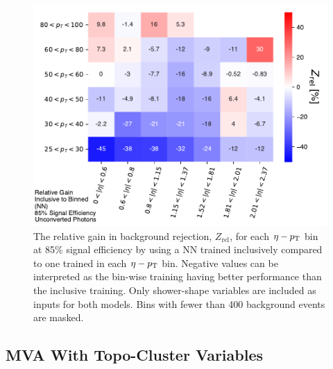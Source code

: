 \begin{figure}[!htb]
    \centering
    \includegraphics[width=.85\textwidth]{chapters/chapter4_photonID/images/NNinclusive_v_NN_normed.pdf}
    \caption[The relative gain in background rejection by using a \gls{NN} trained inclusively compared to one trained bin-wise]
    {The relative gain in background rejection, $Z_{\text{rel}}$, for each $\eta-p_{\text{T}}$ bin at 85\% signal efficiency by using a \gls{NN} trained inclusively compared to one trained in each $\eta-p_{\text{T}}$ bin. Negative values can be interpreted as the bin-wise training having better performance than the inclusive training. Only shower-shape variables are included as inputs for both models. Bins with fewer than 400 background events are masked.}
    \label{fig:nninclusive-v-binned}
\end{figure}



\subsection{MVA With Topo-Cluster Variables}

